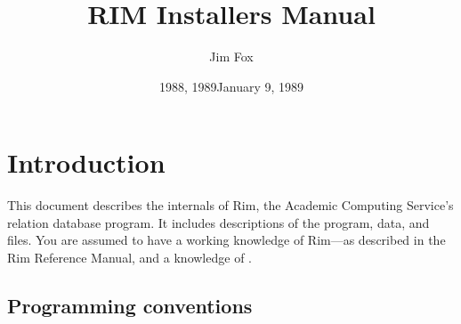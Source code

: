 \documentclass[11pt,a4paper]{report}
\begin{document}
%
\author{Jim Fox}
\date  {1988, 1989}
\title {RIM Installers Manual}
\date   {January 9, 1989}

\def\UCScopytext{%
  Permission is granted to make and distribute verbatim copies of
  this manual provided the copyright notice and this permission notice
  are preserved on all copies.
  \par
  Permission is granted to copy and distribute modified versions of this
  manual under the conditions for verbatim copying, provided also that the
  sections entitled ``Distribution'' and
  ``Rim General Public License'' are included exactly as in the original, and
  provided that the entire resulting derived work is distributed under the
  terms of a permission notice identical to this one.
  \par
  \par}
\maketitle
%
\tableofcontents
\listoftables


%
%
%

%
%
%
\chapter{Introduction}
 
This document describes the internals of Rim,
the Academic Computing Service's relation database program.
It includes descriptions of the program, data, and files.
You are assumed to have a working knowledge of Rim---as
described in the Rim Reference Manual, and a knowledge
of \FortranF.
 
\section{Programming conventions}
 
\end{document}
